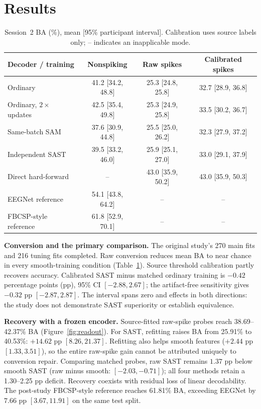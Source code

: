 \section{Results}
\begin{table}[!ht]
\centering
\caption{Session~2 BA (\%), mean [95\% participant interval].
Calibration uses source labels only; -- indicates an inapplicable mode.}
\label{tab:decoding}
\small\setlength{\tabcolsep}{4pt}
\begin{tabular}{lccc}
\toprule
Decoder / training & Nonspiking & Raw spikes & Calibrated spikes \\
\midrule
Ordinary & 41.2 [34.2, 48.8] & 25.3 [24.8, 25.8] & 32.7 [28.9, 36.8] \\
Ordinary, $2\times$ updates & 42.5 [35.4, 49.8] & 25.3 [24.9, 25.8] & 33.5 [30.2, 36.7] \\
Same-batch SAM & 37.6 [30.9, 44.8] & 25.5 [25.0, 26.2] & 32.3 [27.9, 37.2] \\
Independent SAST & 39.5 [33.2, 46.0] & 25.9 [25.1, 27.0] & 33.0 [29.1, 37.9] \\
Direct hard-forward & -- & 43.0 [35.9, 50.2] & 43.0 [35.9, 50.3] \\
EEGNet reference & 54.1 [43.8, 64.2] & -- & -- \\
FBCSP-style reference & 61.8 [52.9, 70.1] & -- & -- \\
\bottomrule
\end{tabular}
\end{table}

\textbf{Conversion and the primary comparison.}
The original study's 270 main fits and 216 tuning fits completed. Raw conversion reduces mean
BA to near chance in every smooth-training condition (Table~\ref{tab:decoding}).
Source threshold calibration partly recovers accuracy. Calibrated SAST minus
matched ordinary training is $-0.42$ percentage points (pp), 95\% CI
$[-2.88,2.67]$; the artifact-free sensitivity gives $-0.32$ pp
$[-2.87,2.87]$. The interval spans zero and effects in both directions: the
study does not demonstrate SAST superiority or establish equivalence.

\textbf{Recovery with a frozen encoder.}
Source-fitted raw-spike probes reach 38.69--42.37\% BA
(Figure~\ref{fig:readout}). For SAST, refitting raises BA from 25.91\% to
40.53\%: $+14.62$ pp $[8.26,21.37]$. Refitting also helps smooth features
($+2.44$ pp $[1.33,3.51]$), so the entire raw-spike gain cannot be attributed
uniquely to conversion repair. Comparing matched probes, raw SAST remains
$1.37$ pp below smooth SAST (raw minus smooth: $[-2.03,-0.71]$); all four
methods retain a 1.30--2.25 pp deficit. Recovery coexists with residual loss
of linear decodability. The post-study FBCSP-style reference reaches 61.81\%
BA, exceeding EEGNet by $7.66$ pp $[3.67,11.91]$ on the same test split.

